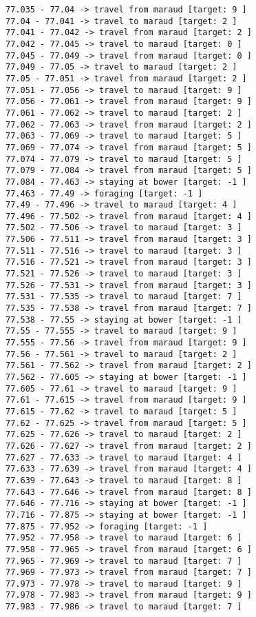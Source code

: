 \documentclass[11pt]{article}
\begin{document}
\begin{Verbatim}[commandchars=\\\{\}]
77.035 - 77.04 -> travel from maraud [target: 9 ]
77.04 - 77.041 -> travel to maraud [target: 2 ]
77.041 - 77.042 -> travel from maraud [target: 2 ]
77.042 - 77.045 -> travel to maraud [target: 0 ]
77.045 - 77.049 -> travel from maraud [target: 0 ]
77.049 - 77.05 -> travel to maraud [target: 2 ]
77.05 - 77.051 -> travel from maraud [target: 2 ]
77.051 - 77.056 -> travel to maraud [target: 9 ]
77.056 - 77.061 -> travel from maraud [target: 9 ]
77.061 - 77.062 -> travel to maraud [target: 2 ]
77.062 - 77.063 -> travel from maraud [target: 2 ]
77.063 - 77.069 -> travel to maraud [target: 5 ]
77.069 - 77.074 -> travel from maraud [target: 5 ]
77.074 - 77.079 -> travel to maraud [target: 5 ]
77.079 - 77.084 -> travel from maraud [target: 5 ]
77.084 - 77.463 -> staying at bower [target: -1 ]
77.463 - 77.49 -> foraging [target: -1 ]
77.49 - 77.496 -> travel to maraud [target: 4 ]
77.496 - 77.502 -> travel from maraud [target: 4 ]
77.502 - 77.506 -> travel to maraud [target: 3 ]
77.506 - 77.511 -> travel from maraud [target: 3 ]
77.511 - 77.516 -> travel to maraud [target: 3 ]
77.516 - 77.521 -> travel from maraud [target: 3 ]
77.521 - 77.526 -> travel to maraud [target: 3 ]
77.526 - 77.531 -> travel from maraud [target: 3 ]
77.531 - 77.535 -> travel to maraud [target: 7 ]
77.535 - 77.538 -> travel from maraud [target: 7 ]
77.538 - 77.55 -> staying at bower [target: -1 ]
77.55 - 77.555 -> travel to maraud [target: 9 ]
77.555 - 77.56 -> travel from maraud [target: 9 ]
77.56 - 77.561 -> travel to maraud [target: 2 ]
77.561 - 77.562 -> travel from maraud [target: 2 ]
77.562 - 77.605 -> staying at bower [target: -1 ]
77.605 - 77.61 -> travel to maraud [target: 9 ]
77.61 - 77.615 -> travel from maraud [target: 9 ]
77.615 - 77.62 -> travel to maraud [target: 5 ]
77.62 - 77.625 -> travel from maraud [target: 5 ]
77.625 - 77.626 -> travel to maraud [target: 2 ]
77.626 - 77.627 -> travel from maraud [target: 2 ]
77.627 - 77.633 -> travel to maraud [target: 4 ]
77.633 - 77.639 -> travel from maraud [target: 4 ]
77.639 - 77.643 -> travel to maraud [target: 8 ]
77.643 - 77.646 -> travel from maraud [target: 8 ]
77.646 - 77.716 -> staying at bower [target: -1 ]
77.716 - 77.875 -> staying at bower [target: -1 ]
77.875 - 77.952 -> foraging [target: -1 ]
77.952 - 77.958 -> travel to maraud [target: 6 ]
77.958 - 77.965 -> travel from maraud [target: 6 ]
77.965 - 77.969 -> travel to maraud [target: 7 ]
77.969 - 77.973 -> travel from maraud [target: 7 ]
77.973 - 77.978 -> travel to maraud [target: 9 ]
77.978 - 77.983 -> travel from maraud [target: 9 ]
77.983 - 77.986 -> travel to maraud [target: 7 ]

\end{Verbatim}
\end{document}
